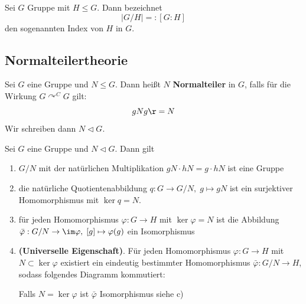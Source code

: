 \documentclass[11pt, a4paper]{article}
\begin{document}
\begin{definition}
    Sei $G$ Gruppe mit $H\leqslant G$. Dann bezeichnet 
    $$|G/H| =: [G:H]$$
    den sogenannten Index von $H$ in $G$.
\end{definition}

\subsection{Normalteilertheorie}
\begin{definition} Sei $G$ eine Gruppe und $N\leqslant G$. Dann heißt $N$ \textbf{Normalteiler} in $G$, falls für die Wirkung $G\curvearrowright^C G$ gilt:
$$gNg\r = N$$
Wir schreiben dann $N \triangleleft G$.
\end{definition}

\begin{theorem} Sei $G$ eine Gruppe und $N\triangleleft G$. Dann gilt
\begin{enumerate}[label= \alph*)]
    \item $G/N$ mit der natürlichen Multiplikation $gN\cdot hN = g\cdot hN$ ist eine Gruppe
    \item die natürliche Quotientenabbildung $q: G\to G/N, \; g\mapsto gN$ ist ein surjektiver Homomorphismus mit $\ker q = N$.
    \item für jeden Homomorphismus $\varphi: G\to H$ mit $\ker \varphi = N$ ist die Abbildung $\bar\varphi : G/N\to \im \varphi,\; [g] \mapsto \varphi(g)$ ein Isomorphismus
    \item \textbf{(Universelle Eigenschaft)}. Für jeden Homomorphismus $\varphi: G\to H$ mit $N\subset \ker \varphi$ existiert ein eindeutig bestimmter Homomorphismus $\bar\varphi: G/N \to H$, sodass folgendes Diagramm kommutiert:
    
    \begin{figure}[h]
        \centering
    \end{figure}
        Falls $N=\ker\varphi$ ist $\bar \varphi$ Isomorphismus siehe c)
\end{enumerate}
\end{theorem}
\end{document}
